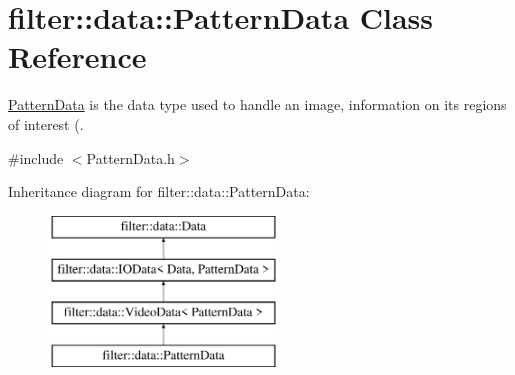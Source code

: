 \hypertarget{classfilter_1_1data_1_1_pattern_data}{}\section{filter\+:\+:data\+:\+:Pattern\+Data Class Reference}
\label{classfilter_1_1data_1_1_pattern_data}


\hyperlink{classfilter_1_1data_1_1_pattern_data}{Pattern\+Data} is the data type used to handle an image, information on its regions of interest (.  




{\ttfamily \#include $<$Pattern\+Data.\+h$>$}

Inheritance diagram for filter\+:\+:data\+:\+:Pattern\+Data\+:\begin{figure}[H]
\begin{center}
\leavevmode
\includegraphics[height=4.000000cm]{dc/d85/classfilter_1_1data_1_1_pattern_data}
\end{center}
\end{figure}
